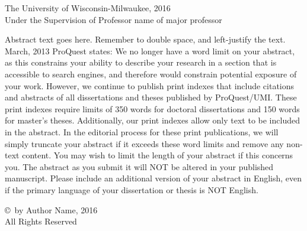 \documentclass[12pt]{article}
\begin{document}
\singlespacing
\begin{center}
The University of Wisconsin-Milwaukee, 2016\\
Under the Supervision of Professor name of major professor\\
\end{center}

\doublespacing
\noindent
Abstract text goes here. Remember to double space, and left-justify the text.
March, 2013 ProQuest states: We no longer have a word limit on your abstract, as this constrains your ability to describe your research in a section that is accessible to search engines, and therefore would constrain potential exposure of your work. However, we continue to publish print indexes that include citations and abstracts of all dissertations and theses published by ProQuest/UMI. These print indexes require limits of 350 words for doctoral dissertations and 150 words for master's theses. Additionally, our print indexes allow only text to be included in the abstract. In the editorial process for these print publications, we will simply truncate your abstract if it exceeds these word limits and remove any non-text content. You may wish to limit the length of your abstract if this concerns you. The abstract as you submit it will NOT be altered in your published manuscript. Please include an additional version of your abstract in English, even if the primary language of your dissertation or thesis is NOT English.
\renewcommand{\thepage}{\roman{page}}

\newpage
\thispagestyle{plain}

\null\vfill
\begin{center}
\copyright \ by Author Name, 2016\\
All Rights Reserved
\end{center}
\vfill\null


\newpage
\thispagestyle{plain}

\tableofcontents

\newpage
\thispagestyle{plain}
\end{document}
